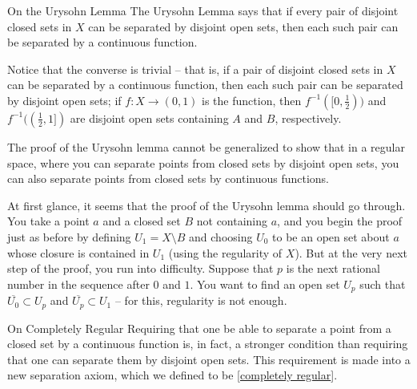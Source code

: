 \begin{remarkBox}{On the Urysohn Lemma}
    The Urysohn Lemma says that if every pair of disjoint closed sets in \( X \) can
    be separated by disjoint open sets, then each such pair can be separated by a 
    continuous function.

    \baseSkip

    Notice that the converse is trivial -- that is, if a pair of disjoint closed sets in
    \( X \) can be separated by a continuous function, then each such pair can be 
    separated by disjoint open sets; if \( f: X \rightarrow ( 0, 1 ) \) is the function,
    then \( f^{ -1 } ( [ 0, \frac{ 1 }{ 2 } ) ) \) and 
    \( f^{ -1 } ( ( \frac{ 1 }{ 2 }, 1 ] ) \) are disjoint open sets containing \( A \)
    and \( B \), respectively.

    \baseRule

    The proof of the Urysohn lemma cannot be generalized to show that in a regular 
    space, where you can separate points from closed sets by disjoint open sets, you
    can also separate points from closed sets by continuous functions.

    \baseSkip

    At first glance, it seems that the proof of the Urysohn lemma should go through.
    You take a point \( a \) and a closed set \( B \) not containing \( a \), and you
    begin the proof just as before by defining \( U_{ 1 } = X \setminus B \) and 
    choosing \( U_{ 0 } \) to be an open set about \( a \) whose closure is contained in
    \( U_{ 1 } \) (using the regularity of \( X \)).
    But at the very next step of the proof, you run into difficulty. Suppose that
    \( p \) is the next rational number in the sequence after \( 0 \) and \( 1 \).
    You want to find an open set \( U_{ p } \) such that 
    \( \overline{ U_{ 0 } } \subset U_{ p } \) and 
    \( \overline{ U_{ p } } \subset U_{ 1 } \) -- for this, regularity is not enough.
\end{remarkBox}

\begin{remarkBox}{On Completely Regular}
    Requiring that one be able to separate a point from a closed set by a continuous
    function is, in fact, a stronger condition than requiring that one can separate
    them by disjoint open sets.
    This requirement is made into a new separation axiom, which we defined to be
    [\hyperlink{def:33_completely_regular}{completely regular}].
\end{remarkBox}

